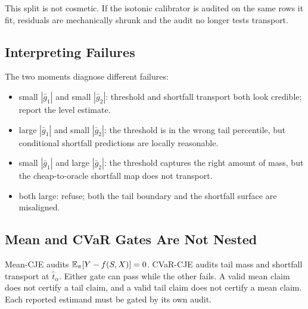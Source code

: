 This split is not cosmetic. If the isotonic calibrator is audited on the same
rows it fit, residuals are mechanically shrunk and the audit no longer tests
transport.

\subsection{Interpreting Failures}
\label{app:audit-cells}

The two moments diagnose different failures:
\begin{itemize}[leftmargin=*,nosep]
\item small $|\bar g_1|$ and small $|\bar g_2|$: threshold and shortfall
transport both look credible; report the level estimate.
\item large $|\bar g_1|$ and small $|\bar g_2|$: the threshold is in the wrong
tail percentile, but conditional shortfall predictions are locally reasonable.
\item small $|\bar g_1|$ and large $|\bar g_2|$: the threshold captures the
right amount of mass, but the cheap-to-oracle shortfall map does not transport.
\item both large: refuse; both the tail boundary and the shortfall surface are
misaligned.
\end{itemize}

\subsection{Mean and CVaR Gates Are Not Nested}

Mean-CJE audits $\mathbb{E}_\pi[Y-f(S,X)]=0$. CVaR-CJE audits tail mass
and shortfall transport at $\hat t_\alpha$. Either gate can pass while the
other fails. A valid mean claim does not certify a tail claim, and a valid tail
claim does not certify a mean claim. Each reported estimand must be gated by
its own audit.
